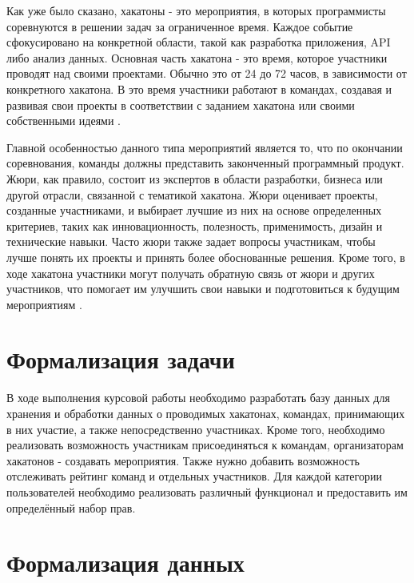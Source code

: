 Как уже было сказано, хакатоны - это мероприятия, в которых программисты соревнуются в решении задач за ограниченное время. Каждое событие сфокусировано на конкретной области, такой как разработка приложения, API либо анализ данных. Основная часть хакатона - это время, которое участники проводят над своими проектами. Обычно это от 24 до 72 часов, в зависимости от конкретного хакатона. В это время участники работают в командах, создавая и развивая свои проекты в соответствии с заданием хакатона или своими собственными идеями \cite{skillfactory}.

Главной особенностью данного типа мероприятий является то, что по окончании соревнования, команды должны представить законченный программный продукт. Жюри, как правило, состоит из экспертов в области разработки, бизнеса или другой отрасли, связанной с тематикой хакатона. Жюри оценивает проекты, созданные участниками, и выбирает лучшие из них на основе определенных критериев, таких как инновационность, полезность, применимость, дизайн и технические навыки. Часто жюри также задает вопросы участникам, чтобы лучше понять их проекты и принять более обоснованные решения. Кроме того, в ходе хакатона участники могут получать обратную связь от жюри и других участников, что помогает им улучшить свои навыки и подготовиться к будущим мероприятиям \cite{hackai}. 

\section{Формализация задачи}

В ходе выполнения курсовой работы необходимо разработать базу данных для хранения и обработки данных о проводимых хакатонах, командах, принимающих в них участие, а также непосредственно участниках. Кроме того, необходимо реализовать возможность участникам присоединяться к командам, организаторам хакатонов - создавать мероприятия. Также нужно добавить возможность отслеживать рейтинг команд и отдельных участников. Для каждой категории пользователей необходимо реализовать различный функционал и предоставить им определённый набор прав.

\section{Формализация данных}

